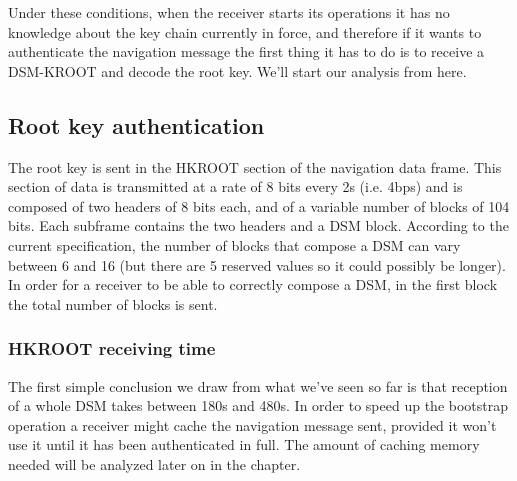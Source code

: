 \vspace{\baselineskip}

Under these conditions, when the receiver starts its operations it has no
knowledge about the key chain currently in force, and therefore if it wants to
authenticate the navigation message the first thing it has to do is to receive a
DSM-KROOT and decode the root key. We'll start our analysis from here.

\subsection{Root key authentication}
The root key is sent in the HKROOT section of the navigation data frame. This
section of data is transmitted at a rate of 8 bits every 2s (i.e. 4bps) and is
composed of two headers of 8 bits each, and of a variable number of blocks of
104 bits. Each subframe contains the two headers and a DSM block. According to
the current specification, the number of blocks that compose a DSM can vary
between 6 and 16 (but there are 5 reserved values so it could possibly be
longer). In order for a receiver to be able to correctly compose a DSM, in the
first block the total number of blocks is sent.

\subsubsection{HKROOT receiving time}
The first simple conclusion we draw from what we've seen so far is that
reception of a whole DSM takes between 180s and 480s. In order to speed up the
bootstrap operation a receiver might cache the navigation message sent, provided
it won't use it until it has been authenticated in full. The amount of caching
memory needed will be analyzed later on in the chapter.

